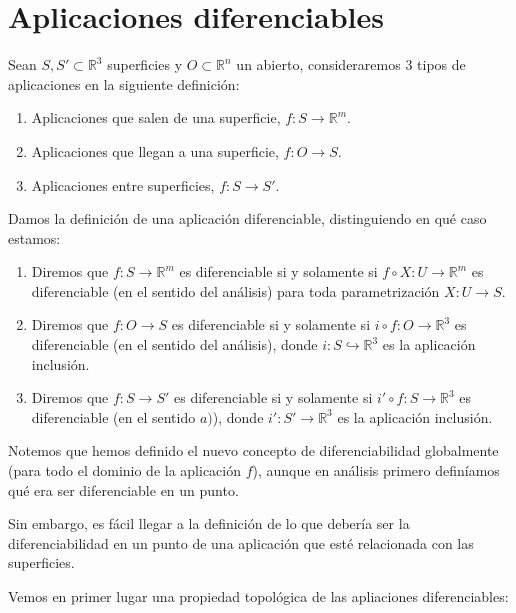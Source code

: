 \section{Aplicaciones diferenciables} 
\noindent
Sean $S,S'\subset \mathbb{R}^3$ superficies y $O\subset \mathbb{R}^n$ un abierto, consideraremos 3 tipos de aplicaciones en la siguiente definición:
\begin{enumerate}[label=\alph*)]
    \item Aplicaciones que salen de una superficie, $f:S\to \mathbb{R}^m$.
    \item Aplicaciones que llegan a una superficie, $f:O\to S$.
    \item Aplicaciones entre superficies, $f:S\to S'$.
\end{enumerate}

\begin{definicion}
    Damos la definición de una aplicación diferenciable, distinguiendo en qué caso estamos:
    \begin{enumerate}[label=\alph*)]
        \item Diremos que $f:S\to \mathbb{R}^m$ es diferenciable si y solamente si $f\circ X:U\to \mathbb{R}^m$ es diferenciable (en el sentido del análisis) para toda parametrización $X:U\to S$.
        \item Diremos que $f:O\to S$ es diferenciable si y solamente si $i\circ f:O\to \mathbb{R}^3$ es diferenciable (en el sentido del análisis), donde $i:S\hookrightarrow \mathbb{R}^3$ es la aplicación inclusión.
        \item Diremos que $f:S\to S'$ es diferenciable si y solamente si $i'\circ f:S\to \mathbb{R}^3$ es diferenciable (en el sentido $a)$), donde $i':S'\to \mathbb{R}^3$ es la aplicación inclusión.
    \end{enumerate}
\end{definicion}

\begin{observacion}
    Notemos que hemos definido el nuevo concepto de diferenciabilidad globalmente (para todo el dominio de la aplicación $f$), aunque en análisis primero definíamos qué era ser diferenciable en un punto.

    Sin embargo, es fácil llegar a la definición de lo que debería ser la diferenciabilidad en un punto de una aplicación que esté relacionada con las superficies.
\end{observacion}

\noindent
Vemos en primer lugar una propiedad topológica de las apliaciones diferenciables:

